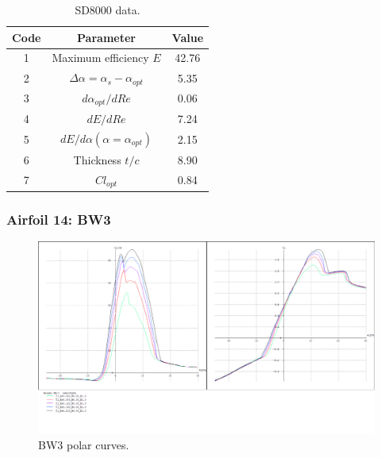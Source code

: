\documentclass[../TFG_Annex.tex]{subfiles}
\begin{document}
\begin{table}[h!]
	\centering
	\begin{tabular}{c|c|c}
		Code & Parameter                                    & Value  \\ \hline
		1    & Maximum efficiency $E$                      &   42.76    \\
		2    & $\Delta \alpha=\alpha_{s}-\alpha_{opt}$    &         5.35          \\
		3    & ${d\alpha_{opt}}/{dRe}$                     &            0.06     \\
		4    & ${dE}/{dRe}$                                &        7.24     \\
		5    & ${dE}/{d \alpha} (\alpha=\alpha_{opt})$      &           2.15        \\
		6    & Thickness $t/c$                            &              8.90      \\
		7    & $Cl_{opt}$  &   0.84
	\end{tabular}
	\caption{SD8000 data.}
	\label{tab:Airf13}
\end{table}



\newpage
\subsubsection{Airfoil 14: BW3}


\begin{figure}[h!]
	\centering
	\includegraphics[width=1\linewidth]{"../../04-Airfoil selection/Imatges airfoils/14-BW3"}
	\caption{BW3 polar curves.}
	\label{fig:14-BW3}
\end{figure}
\end{document}
